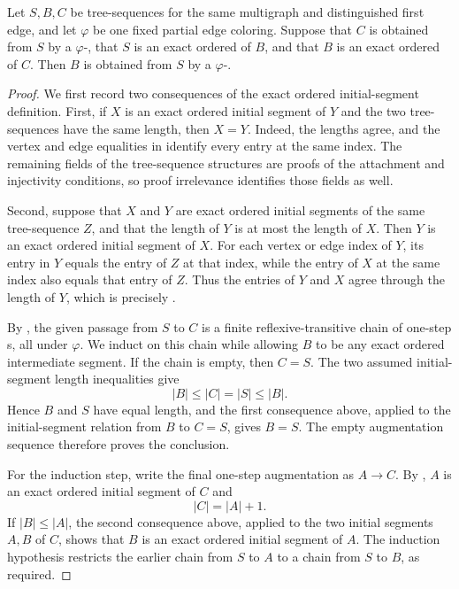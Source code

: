 \begin{lemma}
Let \(S,B,C\) be tree-sequences for the same multigraph and distinguished
first edge, and let \(\varphi\) be one fixed partial edge coloring.  Suppose
that \(C\) is obtained from \(S\) by a
\(\varphi\)-, that \(S\) is an exact
ordered  of \(B\), and that \(B\) is an
exact ordered  of \(C\).  Then \(B\) is
obtained from \(S\) by a
\(\varphi\)-.
\end{lemma}
\begin{proof}
We first record two consequences of the exact ordered initial-segment
definition.  First, if \(X\) is an exact ordered initial segment of \(Y\)
and the two tree-sequences have the same length, then \(X=Y\).  Indeed, the
lengths agree, and the vertex and edge equalities in
 identify every entry at the same
index.  The remaining fields of the tree-sequence structures are proofs of
the attachment and injectivity conditions, so proof irrelevance identifies
those fields as well.

Second, suppose that \(X\) and \(Y\) are exact ordered initial segments of
the same tree-sequence \(Z\), and that the length of \(Y\) is at most the
length of \(X\).  Then \(Y\) is an exact ordered initial segment of \(X\).
For each vertex or edge index of \(Y\), its entry in \(Y\) equals the entry
of \(Z\) at that index, while the entry of \(X\) at the same index also
equals that entry of \(Z\).  Thus the entries of \(Y\) and \(X\) agree
through the length of \(Y\), which is precisely
.

By , the given passage from \(S\) to
\(C\) is a finite reflexive-transitive chain of one-step
s, all under \(\varphi\).  We induct on this
chain while allowing \(B\) to be any exact ordered intermediate segment.
If the chain is empty, then \(C=S\).  The two assumed initial-segment length
inequalities give
\[
  |B|\le |C|=|S|\le |B|.
\]
Hence \(B\) and \(S\) have equal length, and the first consequence above,
applied to the initial-segment relation from \(B\) to \(C=S\), gives
\(B=S\).  The empty augmentation sequence therefore proves the conclusion.

For the induction step, write the final one-step augmentation as
\(A\longrightarrow C\).  By , \(A\) is an
exact ordered initial segment of \(C\) and
\[
  |C|=|A|+1.
\]
If \(|B|\le |A|\), the second consequence above, applied to the two initial
segments \(A,B\) of \(C\), shows that \(B\) is an exact ordered initial
segment of \(A\).  The induction hypothesis restricts the earlier chain
from \(S\) to \(A\) to a chain from \(S\) to \(B\), as required.


\end{proof}
